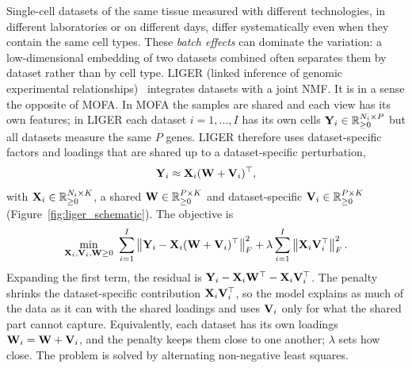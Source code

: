 Single-cell datasets of the same tissue measured with different technologies, in different laboratories or on different days, differ systematically even when they contain the same cell types. These \emph{batch effects} can dominate the variation: a low-dimensional embedding of two datasets combined often separates them by dataset rather than by cell type. LIGER (linked inference of genomic experimental relationships)~\citep{welch2019} integrates datasets with a joint NMF. It is in a sense the opposite of MOFA. In MOFA the samples are shared and each view has its own features; in LIGER each dataset $i=1,\dots,I$ has its own cells $\mathbf{Y}_i\in\mathbb{R}_{\geq0}^{N_i\times P}$ but all datasets measure the same $P$ genes. LIGER therefore uses dataset-specific factors and loadings that are shared up to a dataset-specific perturbation,
\begin{equation}
  \mathbf{Y}_i\approx\mathbf{X}_i(\mathbf{W}+\mathbf{V}_i)^\top,
\end{equation}
with $\mathbf{X}_i\in\mathbb{R}_{\geq0}^{N_i\times K}$, a shared $\mathbf{W}\in\mathbb{R}_{\geq0}^{P\times K}$ and dataset-specific $\mathbf{V}_i\in\mathbb{R}_{\geq0}^{P\times K}$ (Figure~\ref{fig:liger_schematic}). The objective is
\begin{equation}
  \min_{\mX_i,\mV_i,\mW\geq0}\ \sum_{i=1}^I\left\|\mY_i-\mX_i(\mW+\mV_i)^\top\right\|_F^2+\lambda\sum_{i=1}^I\left\|\mX_i\mV_i^\top\right\|_F^2.
  \label{eq:liger}
\end{equation}
Expanding the first term, the residual is $\mathbf{Y}_i-\mathbf{X}_i\mathbf{W}^\top-\mathbf{X}_i\mathbf{V}_i^\top$. The penalty shrinks the dataset-specific contribution $\mathbf{X}_i\mathbf{V}_i^\top$, so the model explains as much of the data as it can with the shared loadings and uses $\mathbf{V}_i$ only for what the shared part cannot capture. Equivalently, each dataset has its own loadings $\mathbf{W}_i=\mathbf{W}+\mathbf{V}_i$, and the penalty keeps them close to one another; $\lambda$ sets how close. The problem is solved by alternating non-negative least squares.


